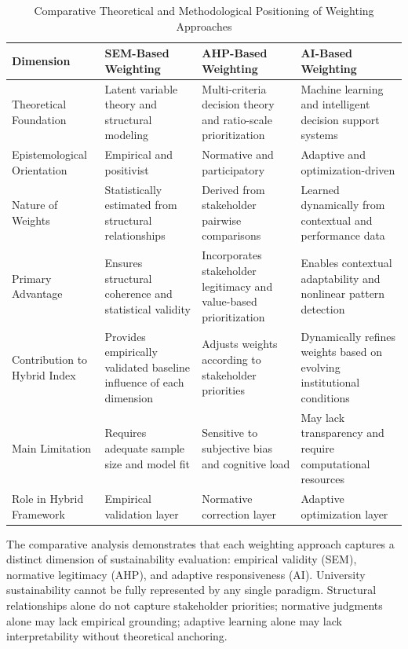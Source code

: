 \documentclass[11pt,a4paper]{article}
\begin{document}
\begin{table}[H]
\centering
\caption{Comparative Theoretical and Methodological Positioning of Weighting Approaches}
\label{tab:weighting_comparison}
\renewcommand{\arraystretch}{1.3}
\begin{tabular}{p{2.5cm} p{3cm} p{3cm} p{3cm}}
\toprule
\textbf{Dimension} & \textbf{SEM-Based Weighting} & \textbf{AHP-Based Weighting} & \textbf{AI-Based Weighting} \\
\midrule

Theoretical Foundation 
& Latent variable theory and structural modeling 
& Multi-criteria decision theory and ratio-scale prioritization 
& Machine learning and intelligent decision support systems \\

Epistemological Orientation 
& Empirical and positivist 
& Normative and participatory 
& Adaptive and optimization-driven \\

Nature of Weights 
& Statistically estimated from structural relationships 
& Derived from stakeholder pairwise comparisons 
& Learned dynamically from contextual and performance data \\

Primary Advantage 
& Ensures structural coherence and statistical validity 
& Incorporates stakeholder legitimacy and value-based prioritization 
& Enables contextual adaptability and nonlinear pattern detection \\

Contribution to Hybrid Index 
& Provides empirically validated baseline influence of each dimension 
& Adjusts weights according to stakeholder priorities 
& Dynamically refines weights based on evolving institutional conditions \\

Main Limitation 
& Requires adequate sample size and model fit 
& Sensitive to subjective bias and cognitive load 
& May lack transparency and require computational resources \\

Role in Hybrid Framework 
& Empirical validation layer 
& Normative correction layer 
& Adaptive optimization layer \\

\bottomrule
\end{tabular}
\end{table}

The comparative analysis demonstrates that each weighting approach captures a distinct dimension of sustainability evaluation: empirical validity (SEM), normative legitimacy (AHP), and adaptive responsiveness (AI). University sustainability cannot be fully represented by any single paradigm. Structural relationships alone do not capture stakeholder priorities; normative judgments alone may lack empirical grounding; adaptive learning alone may lack interpretability without theoretical anchoring.
\end{document}
